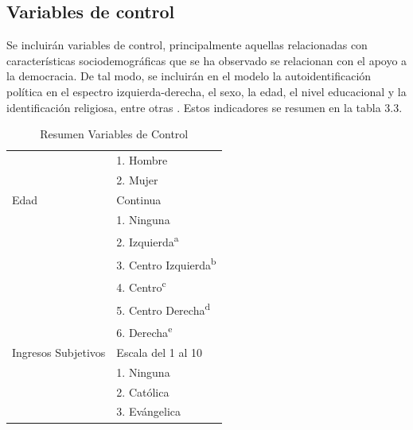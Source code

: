 \documentclass[12pt,twoside]{templates/facsothesis}
\begin{document}
\FloatBarrier

\hypertarget{variables-de-control}{%
\subsection{Variables de control}\label{variables-de-control}}

Se incluirán variables de control, principalmente aquellas relacionadas con características sociodemográficas que se ha observado se relacionan con el apoyo a la democracia. De tal modo, se incluirán en el modelo la autoidentificación política en el espectro izquierda-derecha, el sexo, la edad, el nivel educacional y la identificación religiosa, entre otras \citep{navia2019, gidron2020, eskelinen2020}. Estos indicadores se resumen en la tabla 3.3.

\begin{table}[h]

\caption{\label{tab:unnamed-chunk-7}Resumen Variables de Control}
\centering
\begin{tabu} to 
\toprule
{} & \\
\midrule
 & 1. Hombre\\

 & 2. Mujer\\
Edad & Continua\\
 & 1. Ninguna\\

 & 2. Izquierda\textsuperscript{a}\\

 & 3. Centro Izquierda\textsuperscript{b}\\

 & 4. Centro\textsuperscript{c}\\

 & 5. Centro Derecha\textsuperscript{d}\\

 & 6. Derecha\textsuperscript{e}\\
Ingresos Subjetivos & Escala del 1 al 10\\
 & 1. Ninguna\\

 & 2. Católica\\

 & 3. Evángelica\\


\end{tabu}
\end{table}
\end{document}
